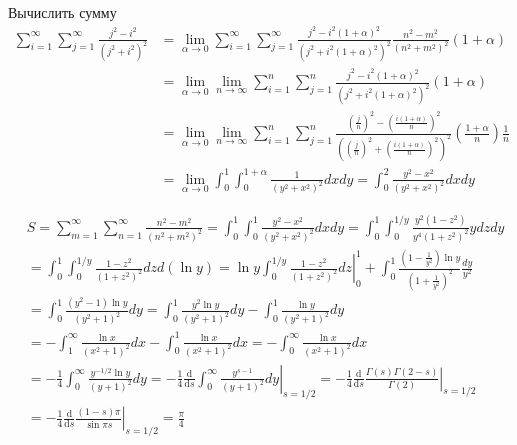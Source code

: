	Вычислить сумму
	$$
	\begin{aligned}
		\sum_{i=1}^{\infty} \sum_{j=1}^{\infty} \frac{j^2-i^2}{\left(j^2+i^2\right)^2} & =\lim _{\alpha \rightarrow 0} \sum_{i=1}^{\infty} \sum_{j=1}^{\infty} \frac{j^2-i^2(1+\alpha)^2}{\left(j^2+i^2(1+\alpha)^2\right)^2} \frac{n^2-m^2}{\left(n^2+m^2\right)^2}(1+\alpha) \\
		& =\lim _{\alpha \rightarrow 0} \lim _{n \rightarrow \infty} \sum_{i=1}^n \sum_{j=1}^n \frac{j^2-i^2(1+\alpha)^2}{\left(j^2+i^2(1+\alpha)^2\right)^2}(1+\alpha) \\
		& =\lim _{\alpha \rightarrow 0} \lim _{n \rightarrow \infty} \sum_{i=1}^n \sum_{j=1}^n \frac{\left(\frac{j}{n}\right)^2-\left(\frac{i(1+\alpha)}{n}\right)^2}{\left(\left(\frac{j}{n}\right)^2+\left(\frac{i(1+\alpha)}{n}\right)^2\right)^2}\left(\frac{1+\alpha}{n}\right) \frac{1}{n} \\
		& =\lim _{\alpha \rightarrow 0} \int_0^1 \int_0^{1+\alpha} \frac{1}{\left(y^2+x^2\right)^2} d x d y=\int_0^2 \frac{y^2-x^2}{\left(y^2+x^2\right)^2} d x d y
	\end{aligned}
	$$
	
	$$\begin{aligned}
		& S=\sum_{m=1}^{\infty} \sum_{n=1}^{\infty} \frac{n^2-m^2}{\left(n^2+m^2\right)^2}=\int_0^1 \int_0^1 \frac{y^2-x^2}{\left(y^2+x^2\right)^2} d x d y=\int_0^1 \int_0^{1 / y} \frac{y^2\left(1-z^2\right)}{y^4\left(1+z^2\right)^2} y d z d y \\
		& =\int_0^1 \int_0^{1 / y} \frac{1-z^2}{\left(1+z^2\right)^2} d z d(\ln y)=\left.\ln y \int_0^{1 / y} \frac{1-z^2}{\left(1+z^2\right)^2} d z\right|_0 ^1+\int_0^1 \frac{\left(1-\frac{1}{y^2}\right) \ln y}{\left(1+\frac{1}{y^2}\right)^2} \frac{d y}{y^2} \\
		& =\int_0^1 \frac{\left(y^2-1\right) \ln y}{\left(y^2+1\right)^2} d y=\int_0^1 \frac{y^2 \ln y}{\left(y^2+1\right)^2} d y-\int_0^1 \frac{\ln y}{\left(y^2+1\right)^2} d y \\
		& =-\int_1^{\infty} \frac{\ln x}{\left(x^2+1\right)^2} d x-\int_0^1 \frac{\ln x}{\left(x^2+1\right)^2} d x=-\int_0^{\infty} \frac{\ln x}{\left(x^2+1\right)^2} d x \\
		& =-\frac{1}{4} \int_0^{\infty} \frac{y^{-1 / 2} \ln y}{(y+1)^2} d y=-\left.\frac{1}{4} \frac{\mathrm{d}}{\mathrm{d} s} \int_0^{\infty} \frac{y^{s-1}}{(y+1)^2} d y\right|_{s=1 / 2}=-\left.\frac{1}{4} \frac{\mathrm{d}}{\mathrm{d} s} \frac{\Gamma(s) \Gamma(2-s)}{\Gamma(2)}\right|_{s=1 / 2} \\
		& =-\left.\frac{1}{4} \frac{\mathrm{d}}{\mathrm{d} s} \frac{(1-s) \pi}{\sin \pi s}\right|_{s=1 / 2}=\frac{\pi}{4} \\
		&
	\end{aligned}$$

